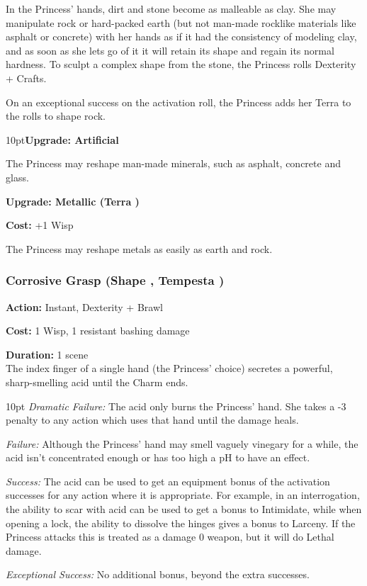 \noindent In the Princess' hands, dirt and stone become as malleable as clay. She may manipulate rock or hard-packed earth (but not man-made rocklike materials like asphalt or concrete) with her hands as if it had the consistency of modeling clay, and as soon as she lets go of it it will retain its shape and regain its normal hardness. To sculpt a complex shape from the stone, the Princess rolls Dexterity + Crafts.

On an exceptional success on the activation roll, the Princess adds her Terra to the rolls to shape rock.
\begin{myindentpar}{10pt}\textbf{Upgrade: Artificial}

The Princess may reshape man-made minerals, such as asphalt, concrete and glass.

\textbf{Upgrade: Metallic (Terra \textbullet\textbullet)}

\noindent \textbf{Cost:} +1 Wisp

The Princess may reshape metals as easily as earth and rock.\end{myindentpar}

\subsubsection*{Corrosive Grasp (Shape \textbullet, Tempesta \textbullet)}

\noindent \textbf{Action:} Instant, Dexterity + Brawl

\noindent \textbf{Cost:} 1 Wisp, 1 resistant bashing damage

\noindent \textbf{Duration:} 1 scene \\

\noindent The index finger of a single hand (the Princess' choice) secretes a powerful, sharp-smelling acid until the Charm ends.

\begin{myindentpar}{10pt}    \emph{Dramatic Failure:} The acid only burns the Princess' hand. She takes a -3 penalty to any action which uses that hand until the damage heals.

    \emph{Failure:} Although the Princess' hand may smell vaguely vinegary for a while, the acid isn't concentrated enough or has too high a pH to have an effect.

    \emph{Success:} The acid can be used to get an equipment bonus of the activation successes for any action where it is appropriate. For example, in an interrogation, the ability to scar with acid can be used to get a bonus to Intimidate, while when opening a lock, the ability to dissolve the hinges gives a bonus to Larceny. If the Princess attacks this is treated as a damage 0 weapon, but it will do Lethal damage. 

    \emph{Exceptional Success:} No additional bonus, beyond the extra successes.\end{myindentpar}


